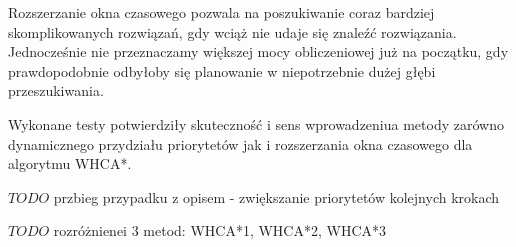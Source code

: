 Rozszerzanie okna czasowego pozwala na poszukiwanie coraz bardziej skomplikowanych rozwiązań, gdy wciąż nie udaje się znaleźć rozwiązania. Jednocześnie nie przeznaczamy większej mocy obliczeniowej już na początku, gdy prawdopodobnie odbyłoby się planowanie w niepotrzebnie dużej głębi przeszukiwania.

Wykonane testy potwierdziły skuteczność i sens wprowadzeniua metody zarówno dynamicznego przydziału priorytetów jak i rozszerzania okna czasowego dla algorytmu WHCA*.

$TODO$
przbieg przypadku z opisem - zwiększanie priorytetów kolejnych krokach

$TODO$ rozróżnienei 3 metod: WHCA*1, WHCA*2, WHCA*3
